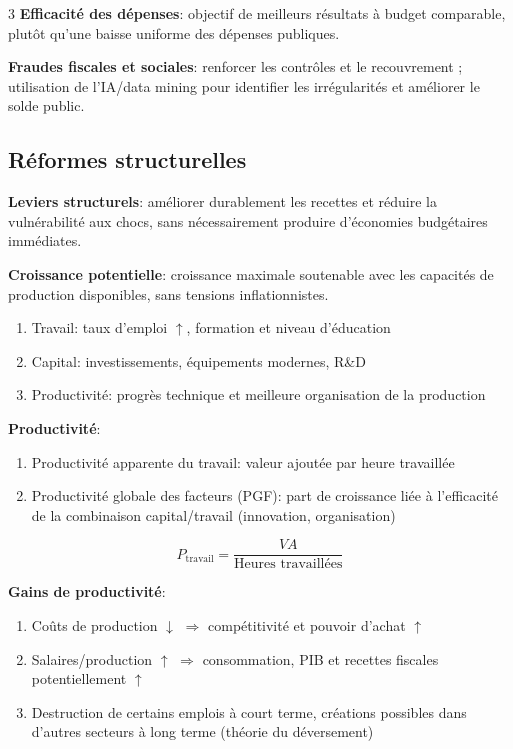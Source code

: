 \documentclass[12pt, a4paper]{article}
\begin{document}
\begin{multicols*}{3}
\textbf{Efficacité des dépenses}: objectif de meilleurs résultats à budget comparable, plutôt qu'une baisse uniforme des dépenses publiques.

\textbf{Fraudes fiscales et sociales}: renforcer les contrôles et le recouvrement ; utilisation de l'IA/data mining pour identifier les irrégularités et améliorer le solde public.

\subsection{Réformes structurelles}

\textbf{Leviers structurels}: améliorer durablement les recettes et réduire la vulnérabilité aux chocs, sans nécessairement produire d'économies budgétaires immédiates.

\textbf{Croissance potentielle}: croissance maximale soutenable avec les capacités de production disponibles, sans tensions inflationnistes.
\begin{enumerate}[\roman*.]
  \item Travail: taux d'emploi $\uparrow$, formation et niveau d'éducation
  \item Capital: investissements, équipements modernes, R\&D
  \item Productivité: progrès technique et meilleure organisation de la production
\end{enumerate}

\textbf{Productivité}:
\begin{enumerate}[\roman*.]
  \item Productivité apparente du travail: valeur ajoutée par heure travaillée
  \item Productivité globale des facteurs (PGF): part de croissance liée à l'efficacité de la combinaison capital/travail (innovation, organisation)
\end{enumerate}
\[
\boxed{P_{\text{travail}}=\frac{VA}{\text{Heures travaillées}}}
\]

\textbf{Gains de productivité}:
\begin{enumerate}[\roman*.]
  \item Coûts de production $\downarrow$ $\Rightarrow$ compétitivité et pouvoir d'achat $\uparrow$
  \item Salaires/production $\uparrow$ $\Rightarrow$ consommation, PIB et recettes fiscales potentiellement $\uparrow$
  \item Destruction de certains emplois à court terme, créations possibles dans d'autres secteurs à long terme (théorie du déversement)
\end{enumerate}


\end{multicols*}
\end{document}
